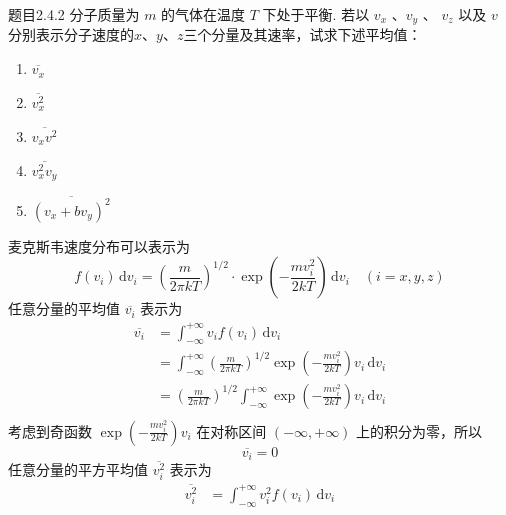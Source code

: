 \begin{question}{题目2.4.2}
    分子质量为 $m$ 的气体在温度 $T$ 下处于平衡. 若以 $v_x$ 、$v_y$ 、 $v_z$ 以及 $v$ 分别表示分子速度的$x$、$y$、$z$三个分量及其速率，试求下述平均值：
    \begin{enumerate}
        \item[(1)] $\overline{v_x}$
        \item[(2)] $\overline{v_x^2}$
        \item[(3)] $\overline{v_xv^2}$
        \item[(4)] $\overline{v_x^2v_y}$
        \item[(5)] $\overline{(v_x+bv_y)^2}$
    \end{enumerate}
\end{question}
\begin{solution}
    麦克斯韦速度分布可以表示为
    \begin{equation}
        f(v_i) \,\mathrm{d}v_i = \left(\frac{m}{2\pi kT}\right)^{1/2} \cdot \exp\left(- \frac{mv_i^2}{2kT}\right) \,\mathrm{d}v_i
        \quad
        (i = x, y, z)
    \end{equation}
    任意分量的平均值 $\overline{v_i}$ 表示为
    \begin{equation}
        \begin{aligned}
            \overline{v_i}
             & = \int_{-\infty}^{+\infty} v_if(v_i) \,\mathrm{d}v_i                                                                     \\
             & = \int_{-\infty}^{+\infty} \left(\frac{m}{2\pi kT}\right)^{1/2} \exp\left(-\frac{mv_i^2}{2kT}\right) v_i \,\mathrm{d}v_i \\
             & = \left(\frac{m}{2\pi kT}\right)^{1/2} \int_{-\infty}^{+\infty} \exp\left(-\frac{mv_i^2}{2kT}\right) v_i \,\mathrm{d}v_i \\
        \end{aligned}
    \end{equation}
    考虑到奇函数 $\displaystyle \exp\left(-\frac{mv_i^2}{2kT} \right) v_i$ 在对称区间 $(-\infty, +\infty)$ 上的积分为零，所以
    \begin{equation}\label{麦克斯韦速度分布的平均值}
        \overline{v_i} = 0
    \end{equation}
    任意分量的平方平均值 $\overline{v_i^2}$ 表示为
    \begin{equation}
        \begin{aligned}
            \overline{v_i^2}
             & = \int_{-\infty}^{+\infty} v_i^2 f(v_i) \,\mathrm{d}v_i                                                                    \\

\end{aligned}
\end{equation}
\end{solution}
